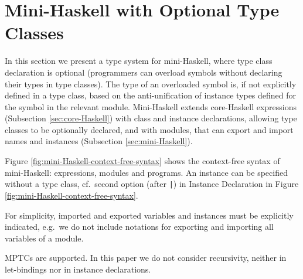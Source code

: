 \section{Mini-Haskell with Optional Type Classes}
\label{Optional-type-classes}

In this section we present a type system for mini-Haskell, where type
class declaration is optional (programmers can overload symbols
without declaring their types in type classes). The type of an
overloaded symbol is, if not explicitly defined in a type class, based
on the anti-unification of instance types defined for the symbol in
the relevant module. Mini-Haskell extends core-Haskell expressions
(Subsection \ref{sec:core-Haskell}) with class and instance
declarations, allowing type classes to be optionally declared, and
with modules, that can export and import names and instances
(Subsection \ref{sec:mini-Haskell}).

Figure \ref{fig:mini-Haskell-context-free-syntax} shows the
context-free syntax of mini-Haskell: expressions, modules and
programs. An instance can be specified without a type class,
cf.~second option (after {\tt |}) in Instance Declaration in Figure
\ref{fig:mini-Haskell-context-free-syntax}.

For simplicity, imported and exported variables and instances must be
explicitly indicated, e.g.~we do not include notations for exporting
and importing all variables of a module.

MPTCs are supported. In this paper we do not consider recursivity,
neither in let-bindings nor in instance declarations.

